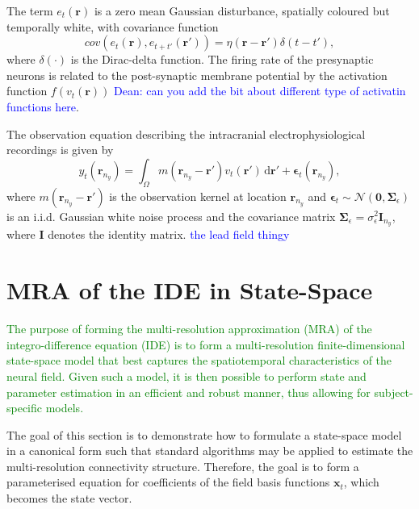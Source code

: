 \documentclass[11pt,draftcls,onecolumn,peerreview]{IEEEtran}
\newcommand{\dean}[1]{\textcolor{green}{#1}}
\newcommand{\parham}[1]{\textcolor{blue}{#1}}
\begin{document}
 The term $e_t(\mathbf r)$ is a zero mean Gaussian disturbance, spatially coloured but temporally white, with covariance function 
\begin{equation}
cov\left(e_{t}\left(\mathbf{r}\right),e_{t+t'}\left(\mathbf{r'}\right)\right)=\eta(\mathbf{r}-\mathbf{r'})\delta(t-t'),
\label{eq:FieldDisturbance}
\end{equation}
where $\delta(\cdot)$ is the Dirac-delta function. The firing rate of the presynaptic neurons is related to the post-synaptic membrane potential by the activation function $f(v_t(\mathbf{r}))$ \parham{Dean: can you add the bit about different type of activatin functions here}.%

The observation equation describing the intracranial electrophysiological recordings is given by
\begin{equation}\label{eq:ObservationEquation}
	y_t(\mathbf{r}_{n_y}) = \int_{\Omega} { m\left(\mathbf{r}_{n_y}-\mathbf{r}'\right) v_t\left(\mathbf{r}'\right) \, \mathrm{d}\mathbf{r}'} + \boldsymbol\epsilon_t(\mathbf{r}_{n_y}), 
\end{equation}
where $m\left(\mathbf{r}_{n_y}-\mathbf{r}'\right)$ is the observation kernel at location $\mathbf{r}_{n_y}$ and  $\boldsymbol{\epsilon}_{t}\sim \mathcal{N}\left(\mathbf{0},\mathbf{\Sigma}_{\epsilon}\right)$  is an i.i.d. Gaussian white noise process and the covariance matrix $\mathbf{\Sigma}_{\epsilon}=\sigma^2_{\epsilon}\mathbf I_{n_y}$, where $\mathbf I$ denotes the identity matrix. \parham{the lead field thingy} 

\section{MRA of the IDE in State-Space}
\dean{The purpose of forming the multi-resolution approximation (MRA) of the integro-difference equation (IDE) is to form a multi-resolution finite-dimensional state-space model that best captures the spatiotemporal characteristics of the neural field. Given such a model, it is then possible to perform state and parameter estimation in an efficient and robust manner, thus allowing for subject-specific models.}

The goal of this section is to demonstrate how to formulate a state-space model in a canonical form such that standard algorithms may be applied to estimate the multi-resolution connectivity structure. Therefore, the goal is to form a parameterised equation for coefficients of the field basis functions $\mathbf{x}_t$, which becomes the state vector.
\end{document}
